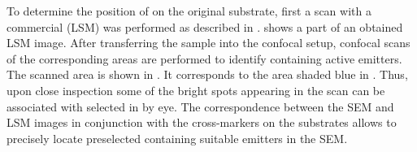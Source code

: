 			To determine the position of \nds on the original substrate, first a scan with a commercial \lsm (LSM) was performed as described in .
			 shows a part of an obtained LSM image.
			After transferring the sample into the confocal setup, confocal \fl scans of the corresponding areas are performed to identify \nds containing active emitters.
			The scanned area is shown in . It corresponds to the area shaded blue in . Thus, upon close inspection some of the bright spots appearing in the \fl scan can be associated with selected \nds in  by eye. The correspondence between the SEM and LSM images in conjunction with the cross-markers on the substrates allows to precisely locate preselected \nds containing suitable emitters in the SEM.

